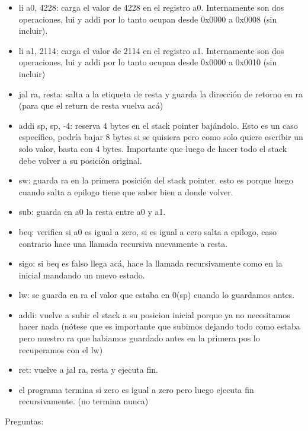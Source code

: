 \documentclass[10pt,a4paper]{article}
\begin{document}
\begin{itemize}
    \item li a0, 4228: carga el valor de 4228 en el registro a0. Internamente son dos operaciones, lui y addi por lo tanto ocupan desde 0x0000 a 0x0008 (sin incluir).
    \item li a1, 2114: carga el valor de 2114 en el registro a1. Internamente son dos operaciones, lui y addi por lo tanto ocupan desde 0x0000 a 0x0010 (sin incluir)
    \item jal ra, resta: salta a la etiqueta de resta y guarda la dirección de retorno en ra (para que el return de resta vuelva acá)
    \item addi sp, sp, -4: reserva 4 bytes en el stack pointer bajándolo. Esto es un caso específico, podría bajar 8 bytes si se quisiera pero como solo quiere escribir un solo valor, basta con 4 bytes. Importante que luego de hacer todo el stack debe volver a su posición original.
    \item sw: guarda ra en la primera posición del stack pointer. esto es porque luego cuando salta a epilogo tiene que saber bien a donde volver.
    \item sub: guarda en a0 la resta entre a0 y a1.
    \item beq: verifica si a0 es igual a zero, si es igual a cero salta a epilogo, caso contrario hace una llamada recursiva nuevamente a resta.
    \item sigo: si beq es falso llega acá, hace la llamada recursivamente como en la inicial mandando un nuevo estado.
    \item lw: se guarda en ra el valor que estaba en 0(sp) cuando lo guardamos antes.
    \item addi: vuelve a subir el stack a su posicion inicial porque ya no necesitamos hacer nada (nótese que es importante que subimos dejando todo como estaba pero nuestro ra que habiamos guardado antes en la primera pos lo recuperamos con el lw)
    \item ret: vuelve a jal ra, resta y ejecuta fin.
    \item el programa termina si zero es igual a zero pero luego ejecuta fin recursivamente. (no termina nunca)
\end{itemize}
Preguntas: 
\end{document}
